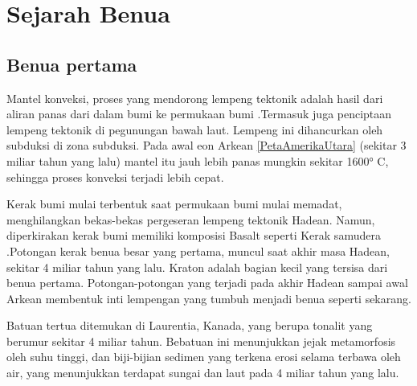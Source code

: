 
\section{Sejarah Benua}

\subsection{Benua pertama}
Mantel konveksi, proses yang mendorong lempeng tektonik adalah hasil dari aliran panas dari dalam bumi ke permukaan bumi \cite{suryasejarah}.Termasuk juga penciptaan lempeng tektonik di pegunungan bawah laut. Lempeng ini dihancurkan oleh subduksi di zona subduksi. Pada awal eon Arkean \ref{PetaAmerikaUtara} (sekitar 3 miliar tahun yang lalu) mantel itu jauh lebih panas mungkin sekitar 1600° C, sehingga proses konveksi terjadi lebih cepat.

Kerak bumi mulai terbentuk saat permukaan bumi mulai memadat, menghilangkan bekas-bekas pergeseran lempeng tektonik Hadean. Namun, diperkirakan kerak bumi memiliki komposisi Basalt seperti Kerak samudera .Potongan kerak benua besar yang pertama, muncul saat akhir masa Hadean, sekitar 4 miliar tahun yang lalu.  Kraton adalah bagian kecil yang tersisa dari benua pertama. Potongan-potongan yang terjadi pada akhir Hadean sampai awal Arkean membentuk inti lempengan yang tumbuh menjadi benua seperti sekarang.

Batuan tertua ditemukan di Laurentia, Kanada, yang berupa tonalit yang berumur sekitar 4 miliar tahun. Bebatuan ini menunjukkan jejak metamorfosis oleh suhu tinggi,  dan biji-bijian sedimen yang terkena erosi selama terbawa oleh air, yang menunjukkan terdapat sungai dan laut pada 4 miliar tahun yang lalu.

